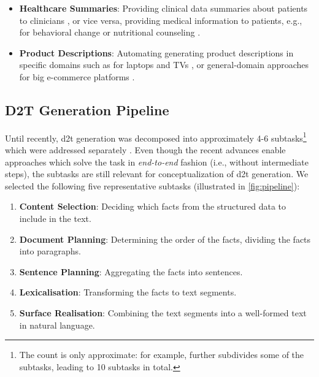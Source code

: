 {\begin{itemize}
    \item \textbf{Healthcare Summaries}: Providing  clinical data summaries about patients to clinicians \cite{portet2009automatic,scott2013data}, or vice versa, providing medical information to patients, e.g., for behavioral change \cite{reiter2003lessons} or nutritional counseling \cite{balloccu-reiter-2022-comparing}.
    \item \textbf{Product Descriptions}: Automating generating product descriptions in specific domains such as for laptops and TVs \cite{wen2015toward,wen2016multi}, or general-domain approaches for big e-commerce platforms \cite{shaoControllableDiverseText2021,kotoCanPretrainedLanguage2022}.
\end{itemize}

\subsection{D2T Generation Pipeline}
\label{sec:d2t-pipeline}


Until recently, \ac{d2t} generation was decomposed into approximately 4-6 subtasks\footnote{The count is only approximate: for example, \citet{milleModD2TMultilayerDataset2023} further subdivides some of the subtasks, leading to 10 subtasks in total.} which were addressed separately \cite{reiterBuildingAppliedNatural1997,reiterArchitectureDatatoTextSystems2007,gattSurveyStateArt2018}. Even though the recent advances enable approaches which  solve the task in \emph{end-to-end} fashion (i.e., without intermediate steps), the subtasks are still relevant for conceptualization of \ac{d2t} generation. We selected the following five representative subtasks (illustrated in \autoref{fig:pipeline}):

\begin{enumerate}
    \item \textbf{Content Selection}: Deciding which facts from the structured data
          to include in the text.
    \item \textbf{Document Planning}: Determining the order of the
          facts, dividing the facts into paragraphs.
    \item \textbf{Sentence Planning}: Aggregating the facts into
          sentences.
    \item \textbf{Lexicalisation}: Transforming the facts to text segments.
    \item \textbf{Surface Realisation}: Combining the text segments into a well-formed text in natural language.
\end{enumerate}


}
